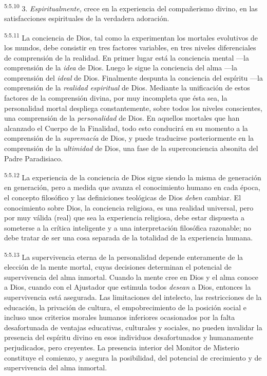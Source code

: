 \par
\textsuperscript{5:5.10} 3. \textit{Espiritualmente,} crece en la experiencia del compañerismo divino, en las satisfacciones espirituales de la verdadera adoración.

\par
\textsuperscript{5:5.11} La conciencia de Dios, tal como la experimentan los mortales evolutivos de los mundos, debe consistir en tres factores variables, en tres niveles diferenciales de comprensión de la realidad. En primer lugar está la conciencia mental ---la comprensión de la \textit{idea} de Dios. Luego le sigue la conciencia del alma ---la comprensión del \textit{ideal} de Dios. Finalmente despunta la conciencia del espíritu ---la comprensión de la \textit{realidad espiritual} de Dios. Mediante la unificación de estos factores de la comprensión divina, por muy incompleta que ésta sea, la personalidad mortal despliega constantemente, sobre todos los niveles conscientes, una comprensión de la \textit{personalidad} de Dios. En aquellos mortales que han alcanzado el Cuerpo de la Finalidad, todo esto conducirá en su momento a la comprensión de la \textit{supremacía} de Dios, y puede traducirse posteriormente en la comprensión de la \textit{ultimidad} de Dios, una fase de la superconciencia absonita del Padre Paradisiaco.

\par
\textsuperscript{5:5.12} La experiencia de la conciencia de Dios sigue siendo la misma de generación en generación, pero a medida que avanza el conocimiento humano en cada época, el concepto filosófico y las definiciones teológicas de Dios \textit{deben} cambiar. El conocimiento sobre Dios, la conciencia religiosa, es una realidad universal, pero por muy válida (real) que sea la experiencia religiosa, debe estar dispuesta a someterse a la crítica inteligente y a una interpretación filosófica razonable; no debe tratar de ser una cosa separada de la totalidad de la experiencia humana.

\par
\textsuperscript{5:5.13} La supervivencia eterna de la personalidad depende enteramente de la elección de la mente mortal, cuyas decisiones determinan el potencial de supervivencia del alma inmortal. Cuando la mente cree en Dios y el alma conoce a Dios, cuando con el Ajustador que estimula todos \textit{desean} a Dios, entonces la supervivencia está asegurada. Las limitaciones del intelecto, las restricciones de la educación, la privación de cultura, el empobrecimiento de la posición social e incluso unos criterios morales humanos inferiores ocasionados por la falta desafortunada de ventajas educativas, culturales y sociales, no pueden invalidar la presencia del espíritu divino en esos individuos desafortunados y humanamente perjudicados, pero creyentes. La presencia interior del Monitor de Misterio constituye el comienzo, y asegura la posibilidad, del potencial de crecimiento y de supervivencia del alma inmortal.

